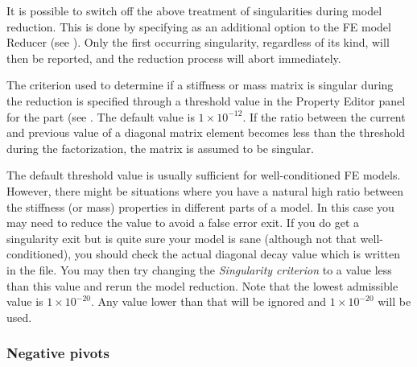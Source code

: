 {

It is possible to switch off the above treatment of singularities during
model reduction. This is done by specifying 
as an additional option to the FE model Reducer (see
).
Only the first occurring singularity, regardless of its kind,
will then be reported, and the reduction process will abort immediately.


The criterion used to determine if a stiffness or mass matrix is
singular during the reduction is specified through a threshold value in
the Property Editor panel for the part (see
.
The default value is $1\times10^{-12}$. If the ratio between the current and
previous value of a diagonal matrix element becomes less than the threshold
during the factorization, the matrix is assumed to be singular.

The default threshold value is usually sufficient for well-conditioned
FE models. However, there might be situations where you have a natural high
ratio between the stiffness (or mass) properties in different parts of a model.
In this case you may need to reduce the value to avoid a false error exit.
If you do get a singularity exit but is quite sure your model is sane (although
not that well-conditioned), you should check the actual diagonal decay value
which is written in the  file.
You may then try changing the {\sl Singularity criterion} to a value less than
this value and rerun the model reduction.
Note that the lowest admissible value is $1\times10^{-20}$.
Any value lower than that will be ignored and $1\times10^{-20}$ will be used.

\subsubsection{Negative pivots}

}
